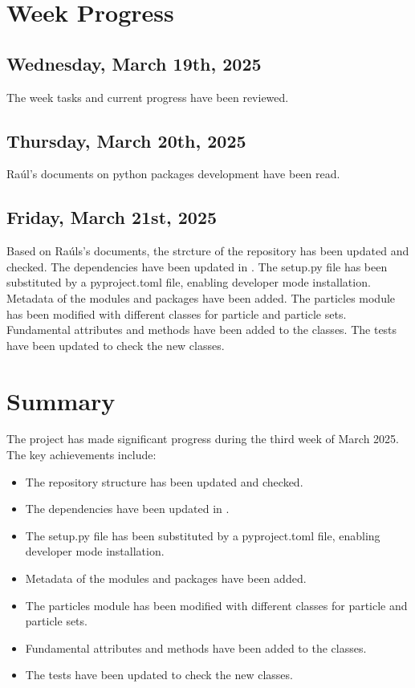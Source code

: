 \documentclass[12pt]{article}
\begin{document}
\section{Week Progress}

\subsection{Wednesday, March 19th, 2025}
The week tasks and current progress have been reviewed. 

\subsection{Thursday, March 20th, 2025}
Raúl's documents on python packages development have been read.

\subsection{Friday, March 21st, 2025}
Based on Raúls's documents, the strcture of the
repository has been updated and checked. 
The dependencies have been updated in
. The setup.py file has been
substituted by a pyproject.toml file, enabling 
developer mode installation. Metadata of the modules
and packages have been added. The particles module
has been modified with different classes for particle
and particle sets. Fundamental attributes and methods
have been added to the classes. The tests have been
updated to check the new classes.

\section{Summary}
The project has made significant progress during the
third week of March 2025. The key achievements include:
\begin{itemize}
    \item The repository structure has been updated and checked.
    \item The dependencies have been updated in .
    \item The setup.py file has been substituted by a pyproject.toml file, enabling developer mode installation.
    \item Metadata of the modules and packages have been added.
    \item The particles module has been modified with different classes for particle and particle sets.
    \item Fundamental attributes and methods have been added to the classes.
    \item The tests have been updated to check the new classes.

\end{itemize}
\end{document}

